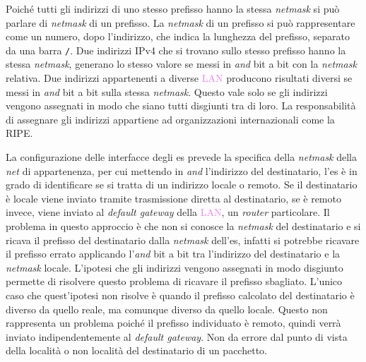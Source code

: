 \documentclass{article}
\numberwithin{equation}{subsection}
\begin{document}
Poiché tutti gli indirizzi di uno stesso prefisso hanno la stessa \textit{netmask} si può parlare di \textit{netmask} di un prefisso. 
La \textit{netmask} di un prefisso si può rappresentare come un numero, dopo l'indirizzo, che indica la lunghezza del prefisso, separato da una barra \texttt{/}. 
Due indirizzi \textcolor{BurntOrange}{IPv4} che si trovano sullo stesso prefisso hanno la stessa \textit{netmask}, generano lo stesso valore se messi in \textit{and} bit a bit con la \textit{netmask} 
relativa. 
Due indirizzi appartenenti a diverse \textcolor{violet}{LAN} producono risultati diversi se messi in \textit{and} bit a bit sulla stessa \textit{netmask}. Questo vale solo se gli indirizzi vengono 
assegnati in modo che siano tutti disgiunti tra di loro. La responsabilità di assegnare gli indirizzi appartiene ad organizzazioni internazionali come la RIPE. 

La configurazione delle interfacce degli \textcolor{Periwinkle}{es} prevede la specifica della \textit{netmask} della \textit{net} di appartenenza, per cui mettendo in \textit{and} l'indirizzo del destinatario, 
l'\textcolor{Periwinkle}{es} è in grado di identificare se si tratta di un indirizzo locale o remoto. Se il destinatario è locale viene inviato tramite trasmissione diretta al destinatario, 
se è remoto invece, viene inviato al \textit{default gateway} della \textcolor{violet}{LAN}, un \textit{router} particolare. 
Il problema in questo approccio è che non si conosce la \textit{netmask} del destinatario e si ricava il prefisso del destinatario dalla \textit{netmask} dell'\textcolor{Periwinkle}{es}, 
infatti si potrebbe ricavare il prefisso errato applicando l'\textit{and} bit a bit tra l'indirizzo del destinatario e la \textit{netmask} locale. L'ipotesi che gli 
indirizzi vengono assegnati in modo disgiunto permette di risolvere questo problema di ricavare il prefisso sbagliato. L'unico caso che quest'ipotesi non risolve è quando il prefisso calcolato del destinatario è diverso da quello reale, ma comunque diverso 
da quello locale. Questo non rappresenta un problema poiché il prefisso individuato è remoto, quindi verrà inviato indipendentemente al \textit{default gateway}. 
Non da errore dal punto di vista della località o non località del destinatario di un pacchetto. 
\end{document}

